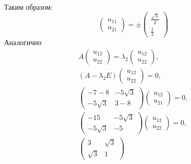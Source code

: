 \begin{example}
\begin{gather*}
    \end{gather*}
    Таким образом:
    \[
        \begin{pmatrix}
            u_{11} \\
            u_{21}
        \end{pmatrix}
        = \pm \begin{pmatrix}
                  \frac{\sqrt{3}}{2} \\
                  \frac{1}{2}
        \end{pmatrix}
    \]
    Аналогично
    \begin{gather*}
        A
        \begin{pmatrix}
            u_{12} \\
            u_{22}
        \end{pmatrix}
        = \lambda_2
        \begin{pmatrix}
            u_{12} \\
            u_{22}
        \end{pmatrix} , \\
        \left ( A - \lambda_2 E \right )
        \begin{pmatrix}
            u_{12} \\
            u_{22}
        \end{pmatrix}
        = 0 , \\
        \begin{pmatrix}
            -7 - 8      & -5 \sqrt{3} \\
            -5 \sqrt{3} & 3 - 8
        \end{pmatrix}
        \begin{pmatrix}
            u_{12} \\
            u_{21}
        \end{pmatrix}
        = 0 , \\
        \begin{pmatrix}
            -15         & -5 \sqrt{3} \\
            -5 \sqrt{3} & -5
        \end{pmatrix}
        \begin{pmatrix}
            u_{12} \\
            u_{22}
        \end{pmatrix}
        = 0 , \\
        \begin{pmatrix}
            3        & \sqrt{3} \\
            \sqrt{3} & 1

\end{pmatrix}
\end{gather*}
\end{example}
